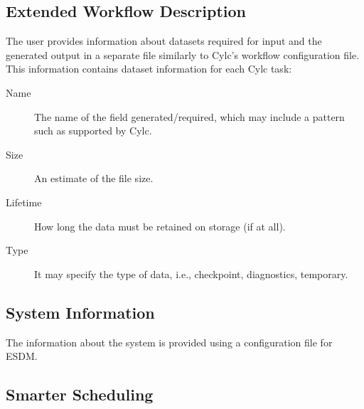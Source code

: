 \documentclass{superfri}
\begin{document}
\subsection{Extended Workflow Description}

The user provides information about datasets required for input and the generated output in a separate file similarly to Cylc's workflow configuration file.
This information contains dataset information for each Cylc task:

\begin{description}

  \item[Name] The name of the field generated/required, which may include a pattern such as supported by Cylc.
  \item[Size] An estimate of the file size.
  \item[Lifetime] How long the data must be retained on storage (if at all).
  \item[Type] It may specify the type of data, i.e., checkpoint, diagnostics, temporary.

\end{description}



\subsection{System Information}

The information about the system is provided using a configuration file for ESDM.

\subsection{Smarter Scheduling}
\end{document}
